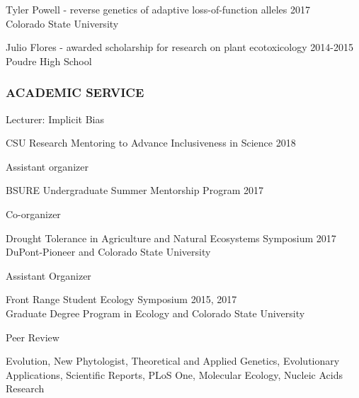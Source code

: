 \documentclass[12pt,english]{article}
\begin{document}
\hspace*{1.0em} Tyler Powell - reverse genetics of adaptive loss-of-function alleles
\hfill
2017\\
\hspace*{2.0em} Colorado State University

\hspace*{1.0em} Julio Flores - awarded scholarship for research on plant ecotoxicology
\hfill
2014-2015\\
\hspace*{2.0em} Poudre High School

\subsubsection*{ACADEMIC SERVICE}
\vspace{-0.5ex}\par

\hspace*{1.0em} Lecturer: Implicit Bias
\par
\hspace*{2.0em} CSU Research Mentoring to Advance Inclusiveness in Science
\hfill
2018

\hspace*{1.0em} Assistant organizer
\par
\hspace*{2.0em} BSURE Undergraduate Summer Mentorship Program
\hfill
2017

\hspace*{1.0em} Co-organizer
\par
\hspace*{2.0em} Drought Tolerance in Agriculture and Natural Ecosystems Symposium
\hfill
2017
\hspace*{2.0em} DuPont-Pioneer and Colorado State University
\par
\vspace{0.5em}
\hspace*{1.0em} Assistant Organizer
\par
\hspace*{2.0em} Front Range Student Ecology Symposium
\hfill
2015, 2017\\
\hspace*{2.0em} Graduate Degree Program in Ecology and Colorado State University
\par
\hspace*{1.0em} Peer Review
\par
\hspace*{2.0em} Evolution, New Phytologist, Theoretical and Applied Genetics, Evolutionary Applications, Scientific Reports, PLoS One, Molecular Ecology, Nucleic Acids Research
\end{document}
